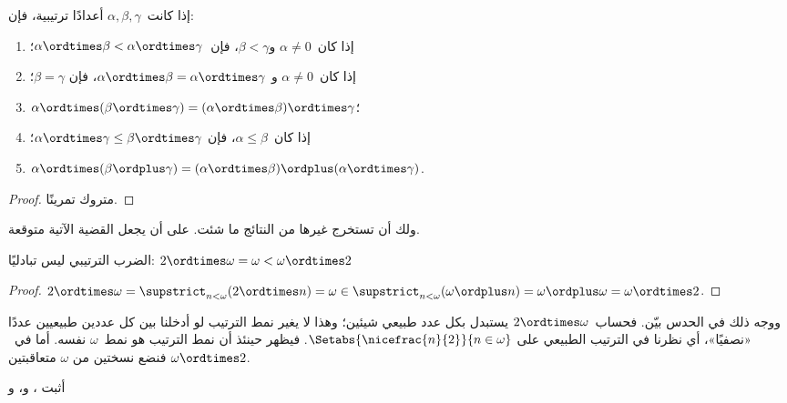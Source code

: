 \documentclass[../../../include/open-logic-section]{subfiles}
\begin{document}
\begin{lem}
إذا كانت~$\alpha, \beta, \gamma$ أعدادًا ترتيبية، فإن:
\begin{enumerate}
	\item{} إذا كان~$\alpha \neq 0$ و$\beta < \gamma$،
	فإن~$\alpha \ordtimes \beta < \alpha \ordtimes \gamma$؛
	\item{} إذا كان~$\alpha \neq 0$ و
	$\alpha \ordtimes \beta = \alpha\ordtimes\gamma$، فإن
	$\beta = \gamma$؛
	\item{} $\alpha \ordtimes (\beta \ordtimes
	\gamma) = (\alpha \ordtimes \beta) \ordtimes \gamma$؛
	\item{} إذا كان~$\alpha \leq \beta$، فإن
	$\alpha \ordtimes \gamma \leq \beta \ordtimes \gamma$؛
	\item{} $\alpha \ordtimes (\beta \ordplus
	\gamma) = (\alpha \ordtimes \beta )\ordplus (\alpha\ordtimes
	\gamma)$.
\end{enumerate}
\end{lem}

\begin{proof}
متروك تمرينًا.
\end{proof}

ولك أن تستخرج غيرها من النتائج ما شئت. على أن
 يجعل القضية الآتية
متوقعة.

\begin{prop}
الضرب الترتيبي ليس تبادليًا:
$2 \ordtimes \omega = \omega < \omega \ordtimes 2$
\end{prop}

\begin{proof}
$2 \ordtimes \omega = \supstrict_{n < \omega}(2\ordtimes n) = \omega
\in \supstrict_{n < \omega}(\omega \ordplus n) = \omega \ordplus
\omega = \omega \ordtimes 2$.
\end{proof}
\noindent
ووجه ذلك في الحدس بيّن. فحساب~$2 \ordtimes \omega$ يستبدل بكل عدد
طبيعي شيئين؛ وهذا لا يغير نمط الترتيب لو أدخلنا بين كل عددين طبيعيين
عددًا «نصفيًا»، أي نظرنا في الترتيب الطبيعي على
$\Setabs{\nicefrac{n}{2}}{n \in \omega}$. فيظهر حينئذ أن نمط الترتيب
هو نمط~$\omega$ نفسه. أما في~$\omega \ordtimes 2$ فنضع نسختين من
$\omega$ متعاقبتين.

\begin{prob}
أثبت
،
و،
و
\end{prob}
\end{document}
